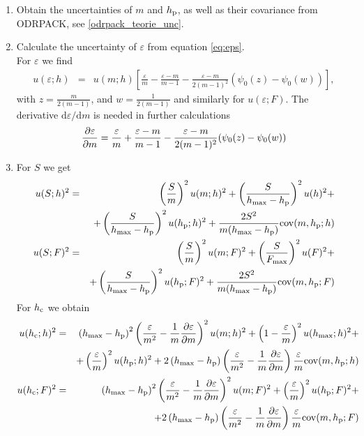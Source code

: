 \begin{enumerate}
 \item \label{opodr_odrpack_unc}
 Obtain the uncertainties of $m$ and $h_\mathrm{p}$, as well as their covariance from ODRPACK, see \ref{odrpack_teorie_unc}.
 
\item \label{opodr_unc_eps}
 Calculate the uncertainty of $\varepsilon$ from equation \eqref{eq:eps}.\\
For $\varepsilon$  we find
 \begin{eqnarray} \label{eq:ueps}
  u (\varepsilon ;h) &=& u(m;h) \left[ 
  \frac{\varepsilon}{m} - \frac{\varepsilon -m}{m -1}  - \frac{\varepsilon - m}{2(m-1)^2} (\psi_0(z)-\psi_0(w)) \right], 
 \end{eqnarray}
 with $z = \frac{m}{2(m-1)}$, and $w = \frac1{2(m-1)}$ 
 and similarly for $u(\varepsilon ; F)$. 
 The derivative $\mathrm{d} \varepsilon /\mathrm{d} m$ is needed in further calculations
 \begin{equation} \label{eq:depsdm}
  \frac{\partial \varepsilon}{\partial m} = \frac{\varepsilon}{m} + \frac{\varepsilon -m}{m -1}  - \frac{\varepsilon - m}{2(m-1)^2} (\psi_0(z)-\psi_0(w)) 
 \end{equation}
 
  
\item \label{opodr_unc_S_hc}
 For $S$ we get
\begin{eqnarray}
 u(S;h)^2 &=& 
 \left( \frac{S}{m}\right)^2 u(m;h)^2 + 
 \left( \frac{S}{h_\mathrm{max}-h_\mathrm{p}} \right)^2 u(h)^2 + \nonumber\\ 
  &&+ \left( \frac{S}{h_\mathrm{max}- h_\mathrm{p}}\right)^2 u(h_\mathrm{p};h)^2 
   + \frac{2S^2}{m(h_\mathrm{max} -  h_\mathrm{p})} \mathrm{cov}(m,h_\mathrm{p};h)  \nonumber\\
    u(S;F)^2 &=& 
 \left( \frac{S}{m}\right)^2 u(m;F)^2 + 
 \left( \frac{S}{F_\mathrm{max}} \right)^2 u(F)^2 + \nonumber \\ 
    &&+ \left( \frac{S}{h_\mathrm{max}- h_\mathrm{p}}\right)^2 u(h_\mathrm{p};F)^2 
   + \frac{2S^2}{m(h_\mathrm{max} -  h_\mathrm{p})} \mathrm{cov}(m,h_\mathrm{p};F)  \nonumber \\
   \label{eq:unc_Sunload}
 \end{eqnarray}
For $h_\mathrm{c}$ we obtain
  \begin{eqnarray}
   u(h_\mathrm{c};h)^2 &=& 
   \left( h_\mathrm{max} - h_\mathrm{p} \right)^2 \left( \frac{\varepsilon}{m^2} - \frac1m \frac{\partial \varepsilon}{\partial m} \right)^2 u(m;h)^2 + 
                  \left( 1- \frac{\varepsilon}{m}\right)^2 u(h_\mathrm{max};h)^2 + \nonumber
    \\ && + \left(\frac{\varepsilon }{m} \right)^2 u(h_\mathrm{p};h)^2 +
          2 \left( h_\mathrm{max} - h_\mathrm{p} \right) \left( \frac{\varepsilon}{m^2} - \frac1m \frac{\partial \varepsilon}{\partial m} \right) \frac{\varepsilon }{m}  \mathrm{cov}(m,h_\mathrm{p};h)   \\
u(h_\mathrm{c};F)^2 &=& 
   \left( h_\mathrm{max} - h_\mathrm{p} \right)^2 \left( \frac{\varepsilon}{m^2} - \frac1m \frac{\partial \varepsilon}{\partial m} \right)^2 u(m;F)^2 + 
  \left(\frac{\varepsilon }{m} \right)^2 u(h_\mathrm{p};F)^2 + \nonumber
    \\  && + 2 \left( h_\mathrm{max} - h_\mathrm{p} \right) \left( \frac{\varepsilon}{m^2} - \frac1m \frac{\partial \varepsilon}{\partial m} \right) \frac{\varepsilon }{m}  \mathrm{cov}(m,h_\mathrm{p};F)   
  \end{eqnarray}


\end{enumerate}
